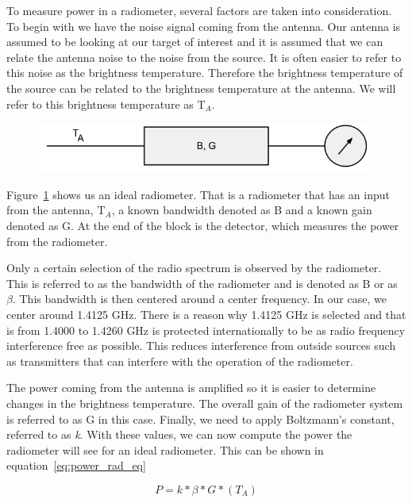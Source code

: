 To measure power in a radiometer, several factors are taken into consideration.  To begin with we have the noise signal coming from the antenna.  Our antenna is assumed to be looking at our target of interest and it is assumed that we can relate the antenna noise to the noise from the source.  It is often easier to refer to this noise as the brightness temperature.  Therefore the brightness temperature of the source can be related to the brightness temperature at the antenna.  We will refer to this brightness temperature as T$_{A}$.  

{\begin{figure}[h!tb] 
\centering
\includegraphics[width=\textwidth]{Images/simple_rad.png}
\label{simplerad}
\end{figure}
}

Figure~\ref{simplerad} shows us an ideal radiometer.  That is a radiometer that has an input from the antenna, T$_{A}$, a known bandwidth denoted as B and a known gain denoted as G.  At the end of the block is the detector, which measures the power from the radiometer.

Only a certain selection of the radio spectrum is observed by the radiometer.  This is referred to as the bandwidth of the radiometer and is denoted as B or as $\beta$.  This bandwidth is then centered around a center frequency.  In our case, we center around 1.4125 GHz.  There is a reason why 1.4125 GHz is selected and that is from 1.4000 to 1.4260 GHz is protected internationally to be as radio frequency interference free as possible.  This reduces interference from outside sources such as transmitters that can interfere with the operation of the radiometer.  

The power coming from the antenna is amplified so it is easier to determine changes in the brightness temperature.  The overall gain of the radiometer system is referred to as G in this case.  Finally, we need to apply Boltzmann's constant, referred to as \textit{k}.  With these values, we can now compute the power the radiometer will see for an ideal radiometer.  This can be shown in equation~\ref{eq:power_rad_eq}

\begin{equation} \label{eq:power_rad_eq}
P=k*\beta*G*(T_{A})
\end{equation}

